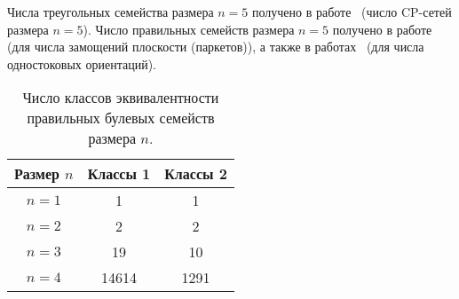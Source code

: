     Числа треугольных семейства размера $n=5$ получено в работе~\cite{allen2014counting} (число CP-сетей размера $n=5$).
    Число правильных семейств размера $n=5$ получено в работе~\cite{mathew2013enumerating} (для числа замощений плоскости (паркетов)), а также в работах~\cite{bosshard2017pseudo, USOphd} (для числа одностоковых ориентаций).

    

    \begin{table}[h]
        \centering
        \captionsetup{justification=centering} %
        \caption{\label{tab:countclasses} Число классов эквивалентности правильных булевых семейств размера $n$.}
        \begin{tabular}{|c|c|c|}
            \toprule
            Размер $n$ & Классы 1 & Классы 2 \\
            \midrule
            $n = 1$ & 1 & 1 \\
            \midrule
            $n = 2$ & 2 & 2 \\
            \midrule
            $n = 3$ & 19 & 10 \\
            \midrule
            $n = 4$ & 14614 & 1291 \\
            \bottomrule
        \end{tabular}
    \end{table}










